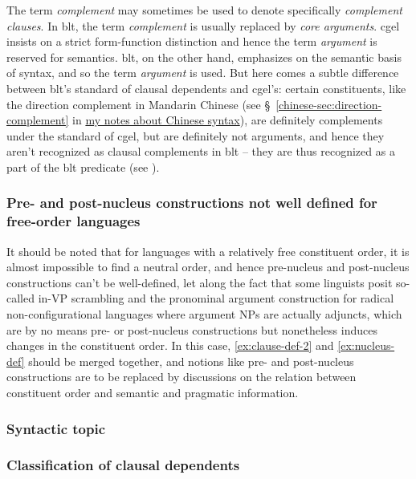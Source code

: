 \documentclass[UTF8, a4paper, oneside, scheme=plain]{ctexart}
\newcommand*{\citesec}[1]{\S~{#1}}
\newcommand*{\term}[1]{\emph{#1}}
\newcommand{\chinesenote}{\href{../Chinese/main.pdf}{my notes about Chinese syntax}}
\begin{document}
The term \term{complement} may sometimes be used to denote specifically \term{complement clauses}. %
In \ac{blt}, the term \term{complement} is usually replaced by \term{core arguments}.
\ac{cgel} insists on a strict form-function distinction 
and hence the term \term{argument} is reserved for semantics.
\ac{blt}, on the other hand, emphasizes on the semantic basis of syntax, 
and so the term \term{argument} is used.
But here comes a subtle difference between \ac{blt}'s standard of clausal dependents and \ac{cgel}'s:
certain constituents, like the direction complement in Mandarin Chinese 
(see \citesec{\ref{chinese-sec:direction-complement}} in \chinesenote),
are definitely complements under the standard of \ac{cgel},
but are definitely not arguments, 
and hence they aren't recognized as clausal complements in \ac{blt}
-- they are thus recognized as a part of the \ac{blt} predicate (see ).

\subsubsection{Pre- and post-nucleus constructions not well defined for free-order languages}\label{sec:free-order-blt}

It should be noted that for languages with a relatively free constituent order,
it is almost impossible to find a neutral order, 
and hence pre-nucleus and post-nucleus constructions 
can't be well-defined,
let along the fact that some linguists posit so-called in-VP scrambling
and the pronominal argument construction for radical non-configurational languages
where argument NPs are actually adjuncts,
which are by no means pre- or post-nucleus constructions 
but nonetheless induces changes in the constituent order.
In this case, \eqref{ex:clause-def-2} and \eqref{ex:nucleus-def} should be merged together,
and notions like pre- and post-nucleus constructions are to be replaced by 
discussions on the relation between constituent order and semantic and pragmatic information.

\subsubsection{Syntactic topic}

\subsubsection{Classification of clausal dependents}\label{sec:complement-type-necessary}
\end{document}
